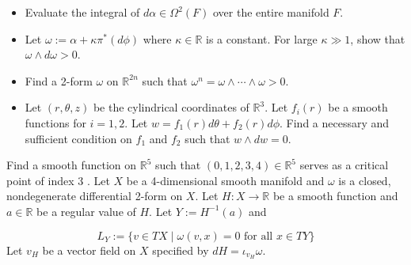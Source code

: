 \documentclass[10pt]{article}
\begin{document}
\begin{itemize}
  \item Evaluate the integral of $d \alpha \in \Omega^{2}(F)$ over the entire manifold $F$.

  \item Let $\omega:=\alpha+\kappa \pi^{*}(d \phi)$ where $\kappa \in \mathbb{R}$ is a constant. For large $\kappa \gg 1$, show that $\omega \wedge d \omega>0$.

\end{itemize}
\newpage

\begin{itemize}
  \item Find a 2-form $\omega$ on $\mathbb{R}^{2 n}$ such that $\omega^{n}=\omega \wedge \cdots \wedge \omega>0$.
  \item Let $(r, \theta, z)$ be the cylindrical coordinates of $\mathbb{R}^{3}$. Let $f_{i}(r)$ be a smooth functions for $i=1,2$. Let $w=f_{1}(r) d \theta+f_{2}(r) d \phi$. Find a necessary and sufficient condition on $f_{1}$ and $f_{2}$ such that $w \wedge d w=0$.
\end{itemize}
\newpage
Find a smooth function on $\mathbb{R}^{5}$ such that $(0,1,2,3,4) \in \mathbb{R}^{5}$ serves as a critical point of index 3 .
\newpage
Let $X$ be a 4-dimensional smooth manifold and $\omega$ is a closed, nondegenerate differential 2-form on $X$. Let $H: X \rightarrow \mathbb{R}$ be a smooth function and $a \in \mathbb{R}$ be a regular value of $H$. Let $Y:=H^{-1}(a)$ and

$$
L_{Y}:=\{v \in T X \mid \omega(v, x)=0 \text { for all } x \in T Y\}
$$
Let $v_{H}$ be a vector field on $X$ specified by $d H=\iota_{v_{H}} \omega$.
\end{document}

